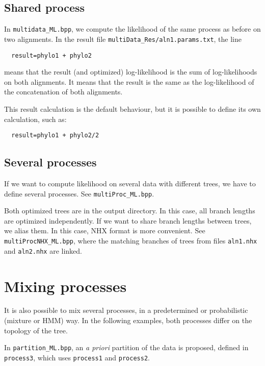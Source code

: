 \documentclass{article}
\begin{document}
\subsection{Shared process}

In \verb#multidata_ML.bpp#, we compute the likelihood of the same
process as before on two alignments. 
In the result file \verb#multiData_Res/aln1.params.txt#, the line

\begin{verbatim}
  result=phylo1 + phylo2
\end{verbatim}

means that the result (and optimized) log-likelihood is the sum of
log-likelihoods on both alignments. It means that the result is the
same as the log-likelihood of the concatenation of both alignments.

This result calculation is the default behaviour, but it is possible
to define its own calculation, such as: 

\begin{verbatim}
  result=phylo1 + phylo2/2
\end{verbatim}

\subsection{Several processes}

If we want to compute likelihood on several data with different trees,
we have to define several processes. See \verb#multiProc_ML.bpp#.

Both optimized trees are in the output directory. In this case, all
branch lengths are optimized independently. If we want to share branch
lengths between trees, we alias them. In this case, NHX format is more
convenient. See \verb#multiProcNHX_ML.bpp#, where the matching
branches of trees from files \verb#aln1.nhx# and \verb#aln2.nhx# are
linked. 

\section{Mixing processes}

It is also possible to mix several processes, in a predetermined or
probabilistic (mixture or HMM) way. In the following examples, both
processes differ on the topology of the tree.

In \verb#partition_ML.bpp#, an \textit{a priori} partition of the data
is proposed, defined in \verb#process3#, which uses \verb#process1#
and \verb#process2#.
\end{document}
